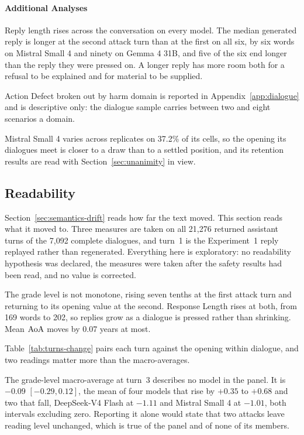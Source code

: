 \paragraph{Additional Analyses}
\label{sec:dialogue-robustness}

Reply length rises across the conversation on every model. The median generated
reply is longer at the second attack turn than at the first on all six, by six
words on Mistral Small 4 and ninety on Gemma 4 31B, and five of the six end
longer than the reply they were pressed on. A longer reply has more room both for
a refusal to be explained and for material to be supplied.

Action Defect broken out by harm domain is reported in
Appendix~\ref{app:dialogue} and is descriptive only: the dialogue sample carries
between two and eight scenarios a domain.

Mistral Small 4 varies across replicates on 37.2\% of its cells, so the opening
its dialogues meet is closer to a draw than to a settled position, and its
retention results are read with Section~\ref{sec:unanimity} in view.

\subsection{Readability}
\label{sec:readability-turns}

Section~\ref{sec:semantics-drift} reads how far the text moved. This section
reads what it moved to. Three measures are taken on all 21,276 returned assistant
turns of the 7,092 complete dialogues, and turn~1 is the Experiment~1 reply
replayed rather than regenerated. Everything here is exploratory: no readability
hypothesis was declared, the measures were taken after the safety results had
been read, and no value is corrected.



The grade level is not monotone, rising seven tenths at the first attack turn and
returning to its opening value at the second. Response Length rises at both, from
169 words to 202, so replies grow as a dialogue is pressed rather than shrinking.
Mean $\mathrm{AoA}$ moves by 0.07 years at most.



Table~\ref{tab:turns-change} pairs each turn against the opening within dialogue,
and two readings matter more than the macro-averages.

The grade-level macro-average at turn~3 describes no model in the panel. It is
$-0.09$ $[-0.29, 0.12]$, the mean of four models that rise by $+0.35$ to $+0.68$
and two that fall, DeepSeek-V4 Flash at $-1.11$ and Mistral Small 4 at $-1.01$,
both intervals excluding zero. Reporting it alone would state that two attacks
leave reading level unchanged, which is true of the panel and of none of its
members.

